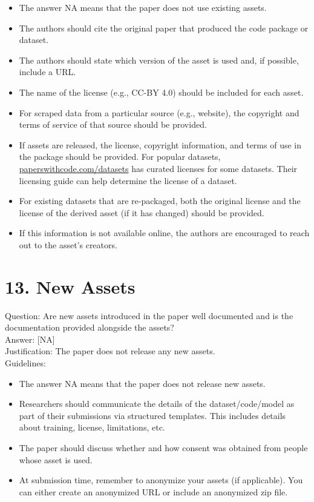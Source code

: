\documentclass[10pt]{article}
\begin{document}
\begin{itemize}
  \item The answer NA means that the paper does not use existing assets.
  \item The authors should cite the original paper that produced the code package or dataset.
  \item The authors should state which version of the asset is used and, if possible, include a URL.
  \item The name of the license (e.g., CC-BY 4.0) should be included for each asset.
  \item For scraped data from a particular source (e.g., website), the copyright and terms of service of that source should be provided.
  \item If assets are released, the license, copyright information, and terms of use in the package should be provided. For popular datasets, \href{http://paperswithcode.com/datasets}{paperswithcode.com/datasets} has curated licenses for some datasets. Their licensing guide can help determine the license of a dataset.
  \item For existing datasets that are re-packaged, both the original license and the license of the derived asset (if it has changed) should be provided.
  \item If this information is not available online, the authors are encouraged to reach out to the asset's creators.
\end{itemize}

\section*{13. New Assets}
Question: Are new assets introduced in the paper well documented and is the documentation provided alongside the assets?\\[0pt]
Answer: [NA]\\
Justification: The paper does not release any new assets.\\
Guidelines:

\begin{itemize}
  \item The answer NA means that the paper does not release new assets.
  \item Researchers should communicate the details of the dataset/code/model as part of their submissions via structured templates. This includes details about training, license, limitations, etc.
  \item The paper should discuss whether and how consent was obtained from people whose asset is used.
  \item At submission time, remember to anonymize your assets (if applicable). You can either create an anonymized URL or include an anonymized zip file.
\end{itemize}
\end{document}
